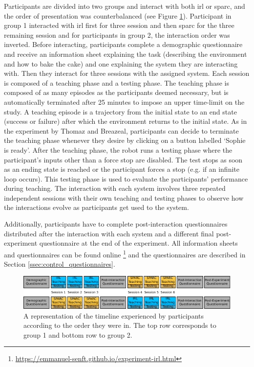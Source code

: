 Participants are divided into two groups and interact with both \gls{irl} or \gls{sparc}, and the order of presentation was counterbalanced (see Figure \ref{fig:control_design}). Participant in group 1 interacted with \gls{irl} first for three session and then \gls{sparc} for the three remaining session and for participants in group 2, the interaction order was inverted. Before interacting, participants complete a demographic questionnaire and receive an information sheet explaining the task (describing the environment and how to bake the cake) and one explaining the system they are interacting with. Then they interact for three sessions with the assigned system. Each session is composed of a teaching phase and a testing phase. The teaching phase is composed of as many episodes as the participants deemed necessary, but is automatically terminated after 25 minutes to impose an upper time-limit on the study. A teaching episode is a trajectory from the initial state to an end state (success or failure) after which the environment returns to the initial state. As in the experiment by Thomaz and Breazeal, participants can decide to terminate the teaching phase whenever they desire by clicking on a button labelled `Sophie is ready'. After the teaching phase, the robot runs a testing phase where the participant's inputs other than a force stop are disabled. The test stops as soon as an ending state is reached or the participant forces a stop (e.g. if an infinite loop occurs). This testing phase is used to evaluate the participants' performance during teaching. The interaction with each system involves three repeated independent sessions with their own teaching and testing phases to observe how the interactions evolve as participants get used to the system.

Additionally, participants have to complete post-interaction questionnaires distributed after the interaction with each system and a different final post-experiment questionnaire at the end of the experiment. All information sheets and questionnaires can be found online \footnote{\url{https://emmanuel-senft.github.io/experiment-irl.html}} and the questionnaires are described in Section \ref{ssec:control_questionnaires}.

\begin{figure}[ht]
	\centering
	\includegraphics[width=1\textwidth]{protocol.pdf}
	\caption{A representation of the timeline experienced by participants according to the order they were in. The top row corresponds to group 1 and bottom row to group 2.}
	\label{fig:control_design}
\end{figure}


